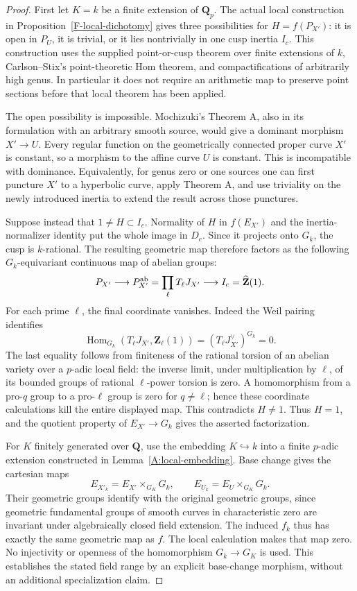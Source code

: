 \begin{proof}
First let $K=k$ be a finite extension of $\mathbf Q_p$. The actual
local construction in Proposition~\ref{F-local-dichotomy} gives
three possibilities for $H=f(P_{X'})$: it is open in $P_U$, it is
trivial, or it lies nontrivially in one cusp inertia $I_c$.
This construction uses the supplied point-or-cusp theorem over
finite extensions of $k$, Carlson--Stix's point-theoretic
Hom theorem, and compactifications of arbitrarily high genus.
In particular it does not require an arithmetic map to preserve
point sections before that local theorem has been applied.

The open possibility is impossible. Mochizuki's Theorem A, also
in its formulation with an arbitrary smooth source, would give a
dominant morphism $X'\to U$. Every regular function on the
geometrically connected proper curve $X'$ is constant, so a
morphism to the affine curve $U$ is constant. This is incompatible
with dominance. Equivalently, for genus zero or one sources one
can first puncture $X'$ to a hyperbolic curve, apply Theorem A,
and use triviality on the newly introduced inertia to extend the
result across those punctures.

Suppose instead that $1\ne H\subset I_c$. Normality of $H$ in
$f(E_{X'})$ and the inertia-normalizer identity put the whole
image in $D_c$. Since it projects onto $G_k$, the cusp is
$k$-rational. The resulting geometric map therefore factors as
the following $G_k$-equivariant continuous map of abelian groups:
\[
 P_{X'}\longrightarrow P_{X'}^{\rm ab}
   =\prod_\ell T_\ell J_{X'}
 \longrightarrow I_c=\widehat{\mathbf Z}(1).
\]
For each prime $\ell$, the final coordinate vanishes. Indeed the
Weil pairing identifies
\[
 \operatorname{Hom}_{G_k}(T_\ell J_{X'},\mathbf Z_\ell(1))
       =(T_\ell J_{X'}^\vee)^{G_k}=0.
\]
The last equality follows from finiteness of the rational torsion
of an abelian variety over a $p$-adic local field: the inverse
limit, under multiplication by $\ell$, of its bounded groups
of rational $\ell$-power torsion is zero. A homomorphism from a
pro-$q$ group to a pro-$\ell$ group is zero for $q\ne\ell$;
hence these coordinate calculations kill the entire displayed
map. This contradicts $H\ne1$. Thus $H=1$, and the quotient
property of $E_{X'}\to G_k$ gives the asserted factorization.

For $K$ finitely generated over $\mathbf Q$, use the embedding
$K\hookrightarrow k$ into a finite $p$-adic extension constructed
in Lemma~\ref{A:local-embedding}. Base change gives the cartesian
maps
\[
 E_{X'_k}=E_{X'}\times_{G_K}G_k,
 \qquad E_{U_k}=E_U\times_{G_K}G_k.
\]
Their geometric groups identify with the original geometric
groups, since geometric fundamental groups of smooth curves in
characteristic zero are invariant under algebraically closed
field extension. The induced $f_k$ thus has exactly the same
geometric map as $f$. The local calculation makes that map zero.
No injectivity or openness of the homomorphism $G_k\to G_K$
is used. This establishes the stated field range by an explicit
base-change morphism, without an additional specialization claim.
\end{proof}

